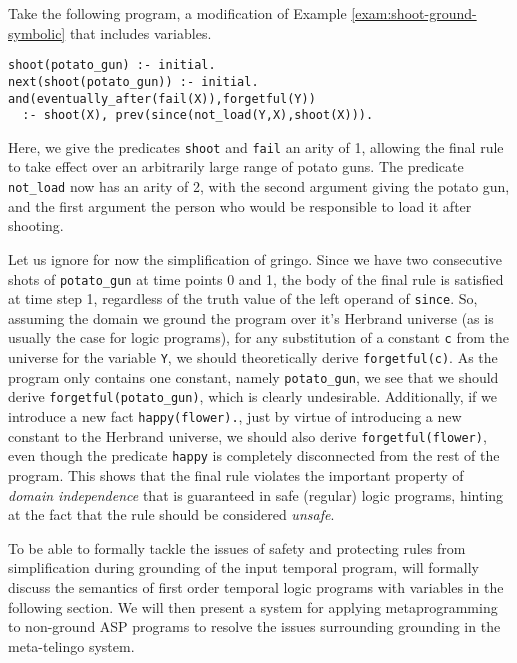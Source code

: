 \begin{example}\label{exam:shoot-nonground-unsafe}
  Take the following program, a modification of Example
  \ref{exam:shoot-ground-symbolic} that includes variables.
\begin{lstlisting}[language=clingo,numbers=none]
shoot(potato_gun) :- initial.
next(shoot(potato_gun)) :- initial.
and(eventually_after(fail(X)),forgetful(Y)) 
  :- shoot(X), prev(since(not_load(Y,X),shoot(X))).
\end{lstlisting}

Here, we give the predicates \verb|shoot| and \verb|fail| an arity of
1, allowing the final rule to take effect over an arbitrarily large
range of potato guns. The predicate \verb|not_load| now has an arity
of 2, with the second argument giving the potato gun, and the first
argument the person who would be responsible to load it after
shooting. 

Let us ignore for now the simplification of gringo. Since we
have two consecutive shots of \verb|potato_gun| at time points 0 and
1, the body of the final rule is satisfied at time step 1, regardless
of the truth value of the left operand of \verb|since|. So, assuming
the domain we ground the program over it's Herbrand universe (as is
usually the case for logic programs), for any substitution of a
constant \verb|c| from the universe for the variable \verb|Y|, we
should theoretically derive \verb|forgetful(c)|. As the program only
contains one constant, namely \verb|potato_gun|, we see that we should
derive \verb|forgetful(potato_gun)|, which is clearly
undesirable. Additionally, if we introduce a new fact
\verb|happy(flower).|, just by virtue of introducing a new constant to
the Herbrand universe, we should also derive \verb|forgetful(flower)|,
even though the predicate \verb|happy| is completely disconnected from
the rest of the program. This shows that the final rule violates the
important property of \textit{domain independence} that is guaranteed
in safe (regular) logic programs, hinting at the fact that the rule
should be considered \textit{unsafe}.
\end{example}

To be able to formally tackle the issues of safety and protecting
rules from simplification during grounding of the input temporal
program, will formally discuss the semantics of first order temporal
logic programs with variables in the following section. We will then
present a system for applying metaprogramming to non-ground ASP
programs to resolve the issues surrounding grounding in the
meta-telingo system.
